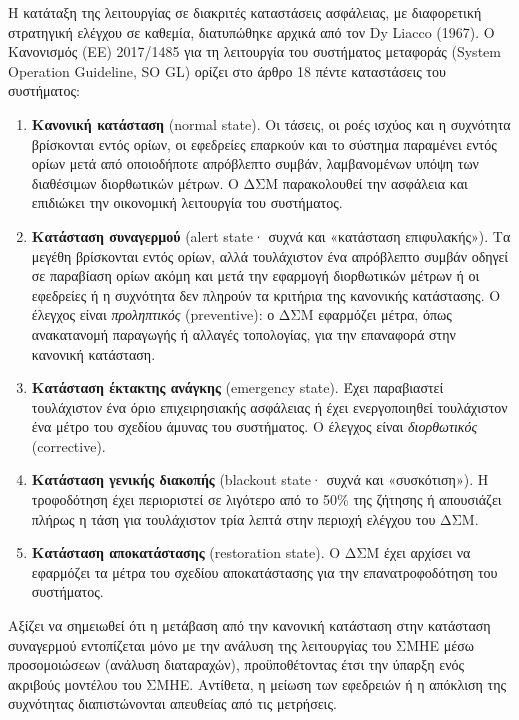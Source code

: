 Η κατάταξη της λειτουργίας σε διακριτές καταστάσεις ασφάλειας, με διαφορετική στρατηγική
ελέγχου σε καθεμία, διατυπώθηκε αρχικά από τον Dy Liacco (1967). Ο
Κανονισμός (ΕΕ) 2017/1485 για τη λειτουργία του συστήματος μεταφοράς (System Operation
Guideline, SO GL) ορίζει στο άρθρο 18 πέντε καταστάσεις του συστήματος:

\begin{enumerate}
\item \textbf{Κανονική κατάσταση} (normal state). Οι τάσεις, οι ροές ισχύος και η συχνότητα
      βρίσκονται εντός ορίων, οι εφεδρείες επαρκούν και το σύστημα παραμένει εντός ορίων μετά
      από οποιοδήποτε απρόβλεπτο συμβάν, λαμβανομένων υπόψη
      των διαθέσιμων διορθωτικών μέτρων. Ο ΔΣΜ παρακολουθεί την ασφάλεια και επιδιώκει την
      οικονομική λειτουργία του συστήματος.
\item \textbf{Κατάσταση συναγερμού} (alert state· συχνά και «κατάσταση επιφυλακής»). Τα
      μεγέθη βρίσκονται εντός ορίων, αλλά τουλάχιστον ένα απρόβλεπτο συμβάν
      οδηγεί σε παραβίαση ορίων ακόμη και μετά την εφαρμογή διορθωτικών μέτρων ή οι εφεδρείες
      ή η συχνότητα δεν πληρούν τα κριτήρια της κανονικής κατάστασης. Ο έλεγχος είναι
      \emph{προληπτικός} (preventive): ο ΔΣΜ εφαρμόζει μέτρα, όπως ανακατανομή παραγωγής ή
      αλλαγές τοπολογίας, για την επαναφορά στην κανονική κατάσταση.
\item \textbf{Κατάσταση έκτακτης ανάγκης} (emergency state). Έχει παραβιαστεί τουλάχιστον
      ένα όριο επιχειρησιακής ασφάλειας ή έχει ενεργοποιηθεί τουλάχιστον ένα μέτρο του
      σχεδίου άμυνας του συστήματος. Ο έλεγχος είναι \emph{διορθωτικός} (corrective).
\item \textbf{Κατάσταση γενικής διακοπής} (blackout state· συχνά και «συσκότιση»). Η τροφοδότηση έχει περιοριστεί σε λιγότερο από το 50\% της ζήτησης ή απουσιάζει πλήρως η τάση για
      τουλάχιστον τρία λεπτά στην περιοχή ελέγχου του ΔΣΜ.
\item \textbf{Κατάσταση αποκατάστασης} (restoration state). Ο ΔΣΜ έχει αρχίσει να
      εφαρμόζει τα μέτρα του σχεδίου αποκατάστασης για την επανατροφοδότηση του
      συστήματος.
\end{enumerate}

Αξίζει να σημειωθεί  ότι η μετάβαση από την κανονική κατάσταση στην κατάσταση συναγερμού εντοπίζεται μόνο με την
ανάλυση της λειτουργίας του ΣΜΗΕ μέσω προσομοιώσεων (ανάλυση διαταραχών), προϋποθέτοντας έτσι την ύπαρξη ενός ακριβούς μοντέλου του ΣΜΗΕ. Αντίθετα, η μείωση των εφεδρειών ή η απόκλιση της
συχνότητας διαπιστώνονται απευθείας από τις μετρήσεις.

